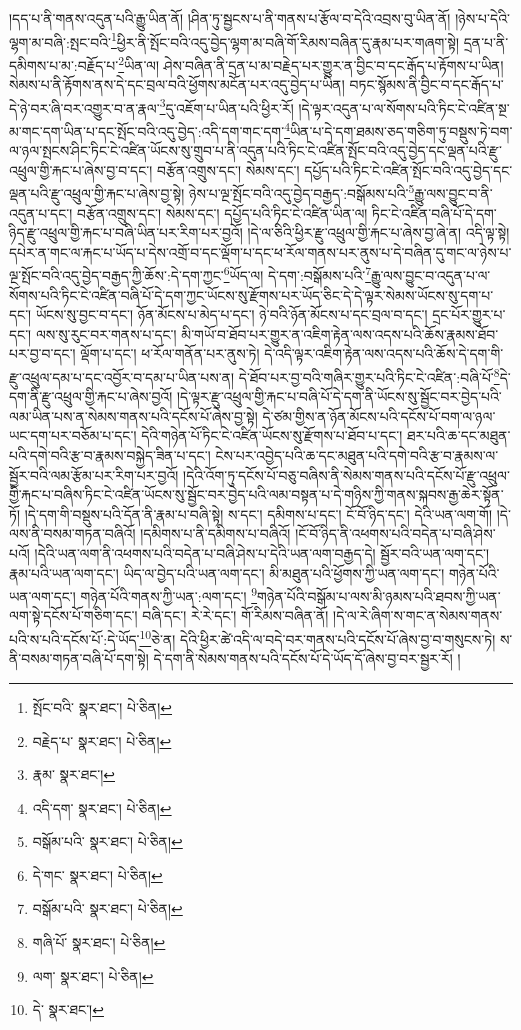 །དད་པ་ནི་གནས་འདུན་པའི་རྒྱུ་ཡིན་ནོ། །ཤིན་ཏུ་སྦྱངས་པ་ནི་གནས་པ་རྩོལ་བ་དེའི་འབྲས་བུ་ཡིན་ནོ། །ཉེས་པ་དེའི་ལྷག་མ་བཞི་:སྤང་བའི་\footnote{སྤོང་བའི་  སྣར་ཐང་།  པེ་ཅིན། }ཕྱིར་ནི་སྤོང་བའི་འདུ་བྱེད་ལྷག་མ་བཞི་གོ་རིམས་བཞིན་དུ་རྣམ་པར་གཞག་སྟེ། དྲན་པ་ནི་དམིགས་པ་མ་:བརྗོད་པ་\footnote{བརྗེད་པ་  སྣར་ཐང་།  པེ་ཅིན། }ཡིན་ལ། ཤེས་བཞིན་ནི་དྲན་པ་མ་བརྗེད་པར་གྱུར་ན་བྱིང་བ་དང་རྒོད་པ་རྟོགས་པ་ཡིན། སེམས་པ་ནི་རྟོགས་ནས་དེ་དང་བྲལ་བའི་ཕྱོགས་མངོན་པར་འདུ་བྱེད་པ་ཡིན། བཏང་སྙོམས་ནི་བྱིང་བ་དང་རྒོད་པ་དེ་ཉེ་བར་ཞི་བར་འགྱུར་བ་ན་རྣལ་\footnote{རྣམ་  སྣར་ཐང་། }དུ་འཇོག་པ་ཡིན་པའི་ཕྱིར་རོ། །དེ་ལྟར་འདུན་པ་ལ་སོགས་པའི་ཏིང་ངེ་འཛིན་སྔ་མ་གང་དག་ཡིན་པ་དང་སྤོང་བའི་འདུ་བྱེད་:འདི་དག་གང་དག་\footnote{འདི་དག་  སྣར་ཐང་།  པེ་ཅིན། }ཡིན་པ་དེ་དག་ཐམས་ཅད་གཅིག་ཏུ་བསྡུས་ཏེ་བག་ལ་ཉལ་སྤངས་ཤིང་ཏིང་ངེ་འཛིན་ཡོངས་སུ་གྲུབ་པ་ནི་འདུན་པའི་ཏིང་ངེ་འཛིན་སྤོང་བའི་འདུ་བྱེད་དང་ལྡན་པའི་རྫུ་འཕྲུལ་གྱི་རྐང་པ་ཞེས་བྱ་བ་དང་། བརྩོན་འགྲུས་དང་། སེམས་དང་། དཔྱོད་པའི་ཏིང་ངེ་འཛིན་སྤོང་བའི་འདུ་བྱེད་དང་ལྡན་པའི་རྫུ་འཕྲུལ་གྱི་རྐང་པ་ཞེས་བྱ་སྟེ། ཉེས་པ་ལྔ་སྤོང་བའི་འདུ་བྱེད་བརྒྱད་:བསྒོམས་པའི་\footnote{བསྒོམ་པའི་  སྣར་ཐང་།  པེ་ཅིན། }རྒྱུ་ལས་བྱུང་བ་ནི་འདུན་པ་དང་། བརྩོན་འགྲུས་དང་། སེམས་དང་། དཔྱོད་པའི་ཏིང་ངེ་འཛིན་ཡིན་ལ། ཏིང་ངེ་འཛིན་བཞི་པོ་དེ་དག་ཉིད་རྫུ་འཕྲུལ་གྱི་རྐང་པ་བཞི་ཡིན་པར་རིག་པར་བྱའོ། །དེ་ལ་ཅིའི་ཕྱིར་རྫུ་འཕྲུལ་གྱི་རྐང་པ་ཞེས་བྱ་ཞེ་ན། འདི་ལྟ་སྟེ། དཔེར་ན་གང་ལ་རྐང་པ་ཡོད་པ་དེས་འགྲོ་བ་དང་ལྡོག་པ་དང་ཕ་རོལ་གནས་པར་ནུས་པ་དེ་བཞིན་དུ་གང་ལ་ཉེས་པ་ལྔ་སྤོང་བའི་འདུ་བྱེད་བརྒྱད་ཀྱི་ཆོས་:དེ་དག་ཀྱང་\footnote{དེ་གང་  སྣར་ཐང་།  པེ་ཅིན། }ཡོད་ལ། དེ་དག་:བསྒོམས་པའི་\footnote{བསྒོམ་པའི་  སྣར་ཐང་།  པེ་ཅིན། }རྒྱུ་ལས་བྱུང་བ་འདུན་པ་ལ་སོགས་པའི་ཏིང་ངེ་འཛིན་བཞི་པོ་དེ་དག་ཀྱང་ཡོངས་སུ་རྫོགས་པར་ཡོད་ཅིང་དེ་དེ་ལྟར་སེམས་ཡོངས་སུ་དག་པ་དང་། ཡོངས་སུ་བྱང་བ་དང་། ཉོན་མོངས་པ་མེད་པ་དང་། ཉེ་བའི་ཉོན་མོངས་པ་དང་བྲལ་བ་དང་། དྲང་པོར་གྱུར་པ་དང་། ལས་སུ་རུང་བར་གནས་པ་དང་། མི་གཡོ་བ་ཐོབ་པར་གྱུར་ན་འཇིག་རྟེན་ལས་འདས་པའི་ཆོས་རྣམས་ཐོབ་པར་བྱ་བ་དང་། ལྡོག་པ་དང་། ཕ་རོལ་གནོན་པར་ནུས་ཏེ། དེ་འདི་ལྟར་འཇིག་རྟེན་ལས་འདས་པའི་ཆོས་དེ་དག་གི་རྫུ་འཕྲུལ་དམ་པ་དང་འབྱོར་བ་དམ་པ་ཡིན་པས་ན། དེ་ཐོབ་པར་བྱ་བའི་གཞིར་གྱུར་པའི་ཏིང་ངེ་འཛིན་:བཞི་པོ་\footnote{གཞི་པོ་  སྣར་ཐང་།  པེ་ཅིན། }དེ་དག་ནི་རྫུ་འཕྲུལ་གྱི་རྐང་པ་ཞེས་བྱའོ། །དེ་ལྟར་རྫུ་འཕྲུལ་གྱི་རྐང་པ་བཞི་པོ་དེ་དག་ནི་ཡོངས་སུ་སྦྱོང་བར་བྱེད་པའི་ལམ་ཡིན་པས་ན་སེམས་གནས་པའི་དངོས་པོ་ཞེས་བྱ་སྟེ། དེ་ཙམ་གྱིས་ན་ཉོན་མོངས་པའི་དངོས་པོ་བག་ལ་ཉལ་ཡང་དག་པར་བཅོམ་པ་དང་། དེའི་གཉེན་པོ་ཏིང་ངེ་འཛིན་ཡོངས་སུ་རྫོགས་པ་ཐོབ་པ་དང་། ཐར་པའི་ཆ་དང་མཐུན་པའི་དགེ་བའི་རྩ་བ་རྣམས་བསྐྱེད་ཟིན་པ་དང་། ངེས་པར་འབྱེད་པའི་ཆ་དང་མཐུན་པའི་དགེ་བའི་རྩ་བ་རྣམས་ལ་སྦྱོར་བའི་ལམ་རྩོམ་པར་རིག་པར་བྱའོ། །དེའི་འོག་ཏུ་དངོས་པོ་བཅུ་བཞིས་ནི་སེམས་གནས་པའི་དངོས་པོ་རྫུ་འཕྲུལ་གྱི་རྐང་པ་བཞིས་ཏིང་ངེ་འཛིན་ཡོངས་སུ་སྦྱོང་བར་བྱེད་པའི་ལམ་བསྟན་པ་དེ་གཉིས་ཀྱི་གནས་སྐབས་རྒྱ་ཆེར་སྟོན་ཏོ། །དེ་དག་གི་བསྡུས་པའི་དོན་ནི་རྣམ་པ་བཞི་སྟེ། ས་དང་། དམིགས་པ་དང་། ངོ་བོ་ཉིད་དང་། དེའི་ཡན་ལག་གོ། །དེ་ལས་ནི་བསམ་གཏན་བཞིའོ། །དམིགས་པ་ནི་དམིགས་པ་བཞིའོ། །ངོ་བོ་ཉིད་ནི་འཕགས་པའི་བདེན་པ་བཞི་ཤེས་པའོ། །དེའི་ཡན་ལག་ནི་འཕགས་པའི་བདེན་པ་བཞི་ཤེས་པ་དེའི་ཡན་ལག་བརྒྱད་དེ། སྦྱོར་བའི་ཡན་ལག་དང་། རྣམ་པའི་ཡན་ལག་དང་། ཡིད་ལ་བྱེད་པའི་ཡན་ལག་དང་། མི་མཐུན་པའི་ཕྱོགས་ཀྱི་ཡན་ལག་དང་། གཉེན་པོའི་ཡན་ལག་དང་། གཉེན་པོའི་གནས་ཀྱི་ཡན་:ལག་དང་། \footnote{ལག་  སྣར་ཐང་།  པེ་ཅིན། }གཉེན་པོའི་བསྒོམ་པ་ལས་མི་ཉམས་པའི་ཐབས་ཀྱི་ཡན་ལག་སྟེ་དངོས་པོ་གཅིག་དང་། བཞི་དང་། རེ་རེ་དང་། གོ་རིམས་བཞིན་ནོ། །དེ་ལ་རེ་ཞིག་ས་གང་ན་སེམས་གནས་པའི་ས་པའི་དངོས་པོ་:དེ་ཡོད་\footnote{དེ་  སྣར་ཐང་། }ཅེ་ན། དེའི་ཕྱིར་ཚེ་འདི་ལ་བདེ་བར་གནས་པའི་དངོས་པོ་ཞེས་བྱ་བ་གསུངས་ཏེ། ས་ནི་བསམ་གཏན་བཞི་པོ་དག་སྟེ། དེ་དག་ནི་སེམས་གནས་པའི་དངོས་པོ་དེ་ཡོད་དོ་ཞེས་བྱ་བར་སྦྱར་རོ། །
